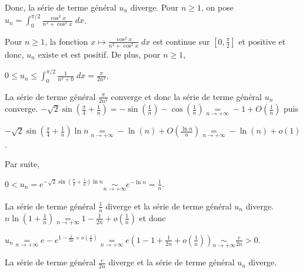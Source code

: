 {{Donc, la série de terme général $u_n$ diverge.
Pour $n\geqslant1$, on pose $u_n=\int_{0}^{\pi/2}\frac{\cos^2x}{n^2+\cos^2x}\;dx$.

Pour $n\geqslant1$, la fonction $x\mapsto\frac{\cos^2x}{n^2+\cos^2x}\;dx$ est continue sur $\left[0,\frac{\pi}{2}\right]$ et positive et donc, $u_n$ existe et est positif. De plus, pour $n\geqslant1$,

\begin{center}
$0\leqslant u_n\leqslant\int_{0}^{\pi/2}\frac{1}{n^2+0}\;dx=\frac{\pi}{2n^2}$.
\end{center}

La série de terme général $\frac{\pi}{2n^2}$ converge et donc la série de terme général $u_n$ converge.
$-\sqrt{2}\sin\left(\frac{\pi}{4}+\frac{1}{n}\right) =-\sin\left(\frac{1}{n}\right)-\cos\left(\frac{1}{n}\right)\underset{n\rightarrow+\infty}{=}-1+O\left(\frac{1}{n}\right)$ puis

\begin{center}
$-\sqrt{2}\sin\left(\frac{\pi}{4}+\frac{1}{n}\right)\ln n\underset{n\rightarrow+\infty}{=}-\ln(n)+O\left(\frac{\ln n}{n}\right)\underset{n\rightarrow+\infty}{=}-\ln(n)+o(1)$.
\end{center}

Par suite,

\begin{center}
$0< u_n=e^{-\sqrt{2}\sin\left(\frac{\pi}{4}+\frac{1}{n}\right)\ln n}\underset{n\rightarrow+\infty}{\sim}e^{-\ln n}=\frac{1}{n}$.
\end{center}

La série de terme général $\frac{1}{n}$ diverge et la série de terme général $u_n$ diverge.
$n\ln\left(1+\frac{1}{n}\right)\underset{n\rightarrow+\infty}{=}1-\frac{1}{2n}+o\left(\frac{1}{n}\right)$ et donc

\begin{center}
$u_n\underset{n\rightarrow+\infty}{=}e-e^{1-\frac{1}{2n}+o\left(\frac{1}{n}\right)}\underset{n\rightarrow+\infty}{=}e\left(1-1+\frac{1}{2n}+o\left(\frac{1}{n}\right)\right)\underset{n\rightarrow+\infty}{\sim}\frac{e}{2n}>0$.
\end{center}

La série de terme général $\frac{e}{2n}$ diverge et la série de terme général $u_n$ diverge.
}
}

